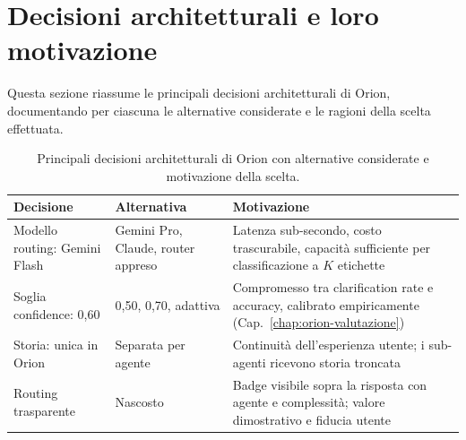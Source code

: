 \section{Decisioni architetturali e loro motivazione}
\label{sec:orion-decisioni}

Questa sezione riassume le principali decisioni architetturali di Orion, 
documentando per ciascuna le alternative considerate e le ragioni della scelta effettuata.

\begin{table}[htbp]
  \centering
  \caption[Decisioni architetturali di Orion]{Principali decisioni architetturali di Orion con alternative considerate e motivazione della scelta.}
  \label{tab:orion-decisioni}
  \begin{tabular}{p{3.5cm}p{3.5cm}p{6cm}}
    \toprule
    \textbf{Decisione}       & \textbf{Alternativa}        & \textbf{Motivazione}                   \\
    \midrule
    Modello routing: Gemini Flash
                             & Gemini Pro, Claude, router appreso~\cite{ong2024routellm}
                             & Latenza sub-secondo, costo trascurabile, capacità sufficiente per classificazione a $K$ etichette \\
    Soglia confidence: 0,60  & 0,50, 0,70, adattiva
                             & Compromesso tra clarification rate e accuracy, calibrato empiricamente (Cap.~\ref{chap:orion-valutazione}) \\
    Storia: unica in Orion   & Separata per agente
                             & Continuità dell'esperienza utente; i sub-agenti ricevono storia troncata \\
    Routing trasparente      & Nascosto
                             & Badge visibile sopra la risposta con agente e complessità; valore dimostrativo e fiducia utente \\
    \bottomrule
  \end{tabular}
\end{table}
